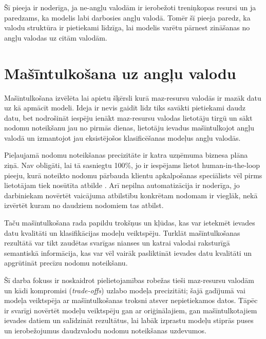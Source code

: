 Šī pieeja ir noderīga, ja ne-angļu valodām ir ierobežoti treniņkopas resursi un ja paredzams, ka modelis labi darbosies angļu valodā. 
Tomēr šī pieeja paredz, ka valodu struktūra ir pietiekami līdzīga, lai modelis varētu pārnest zināšanas no angļu valodas uz citām valodām. 


\section{Mašīntulkošana uz angļu valodu}


Mašīntulkošana izvēlēta lai apietu šķērsli kurā maz-resursu valodās ir mazāk datu uz kā apmācīt modeli. Ideja ir nevis gaidīt līdz tiks savākti pietiekami daudz datu, bet nodrošināt iespēju ienākt maz-resursu valodas lietotāju tirgū un sākt nodomu noteikšanu jau no pirmās dienas, lietotāju ievadus mašīntulkojot angļu valodā un izmantojot jau eksistējošos klasificēšanas modeļus angļu valodās. 

Pieļaujamā nodomu noteikšanas precizitāte ir katra uzņēmuma biznesa plāna ziņā. Nav obligāti, lai tā sasniegtu 100\%, jo ir iespējams lietot human-in-the-loop pieeju, kurā noteikto nodomu pārbauda klientu apkalpošanas speciālists vēl pirms lietotājam tiek nosūtīta atbilde \cite{paikens2020}. Arī nepilna automatizācija ir noderīga, jo darbiniekam novērtēt vaicājuma atbilstību konkrētam nodomam ir vieglāk, nekā izvērtēt kuram no daudziem nodomiem tas atbilst.

Taču mašīntulkošana rada papildu trokšņus un kļūdas, kas var ietekmēt ievades datu kvalitāti un klasifikācijas modeļu veiktspēju. Turklāt mašīntulkošanas rezultātā var tikt zaudētas svarīgas nianses un katrai valodai raksturīgā semantiskā informācija, kas var vēl vairāk pasliktināt ievades datu kvalitāti un apgrūtināt precīzu nodomu noteikšanu.

Šī darba fokuss ir noskaidrot pielietojamības robežas tieši maz-resursu valodām un kādi kompromisi (\textit{trade-offs}) uzlabo modeļa precizitāti; šajā gadījumā vai modeļa veiktspēja ar mašīntulkošanas troksni atsver nepietiekamos datos. Tāpēc ir svarīgi novērtēt modeļu veiktspēju gan ar oriģinālajiem, gan mašīntulkotajiem ievades datiem un salīdzināt rezultātus, lai labāk izprastu modeļu stiprās puses un ierobežojumus daudzvalodu nodomu noteikšanas uzdevumos.

